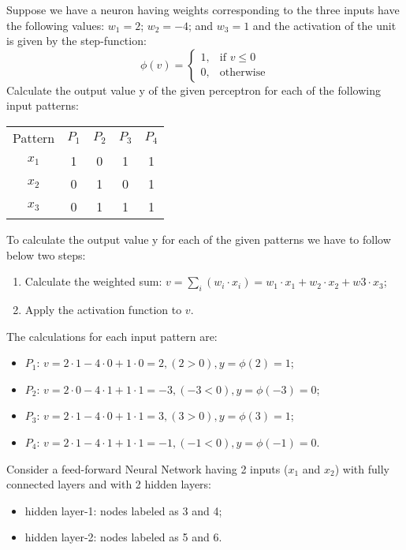 \documentclass[12pt,a4paper]{exam}
\begin{document}
\question
Suppose we have a neuron having weights corresponding to the three inputs have the following values: $w_1 = 2$; $w_2 = -4$; and $w_3 = 1$
and the activation of the unit is given by the step-function: 
\begin{equation*}
\phi(v) = \begin{cases}
1, & \text{if $v\leq0$}\\
0, & \text{otherwise}
\end{cases}
\end{equation*}
Calculate the output value y of the given perceptron for each of the following input patterns:
\begin{center}
\begin{tabular}{ c c c c c }
Pattern	&  $P_1$ & $P_2$ & $P_3$ & $P_4$ \\
$x_1$ & 1 & 0 & 1 & 1 \\
$x_2$ & 0 & 1 & 0 & 1 \\
$x_3$ & 0 & 1 & 1 & 1
\end{tabular}
\end{center}
\fillwithlines{3cm}
\begin{solution}
To calculate the output value y for each of the given patterns we have to follow below two steps:
\begin{enumerate}[label=\alph*]
\item Calculate the weighted sum: $v = \sum_i(w_i\cdot x_i)= w_1 \cdot x_1 + w_2\cdot x_2 + w3\cdot x_3$;
\item Apply the activation function to $v$.
\end{enumerate}
The calculations for each input pattern are:
\begin{itemize}
\item $P_1$: $v = 2\cdot 1-4\cdot 0+1\cdot 0=2, (2>0),  y=\phi(2)=1$;
\item $P_2$: $v = 2\cdot 0-4\cdot 1+1\cdot 1=-3, (-3<0),  y=\phi(-3)=0$;
\item $P_3$: $v = 2\cdot 1-4\cdot 0+1\cdot 1=3, (3>0),  y=\phi(3)=1$;
\item $P_4$: $v = 2\cdot 1-4\cdot 1+1\cdot 1=-1, (-1<0),  y=\phi(-1)=0$.
\end{itemize}
\end{solution}

\question
Consider a feed-forward Neural Network having 2 inputs ($x_1$ and $x_2$) with fully connected layers and with 2 hidden layers:
\begin{itemize}
\item hidden layer-1: nodes labeled as 3 and 4;
\item hidden layer-2: nodes labeled as 5 and 6.
\end{itemize}
\end{document}
